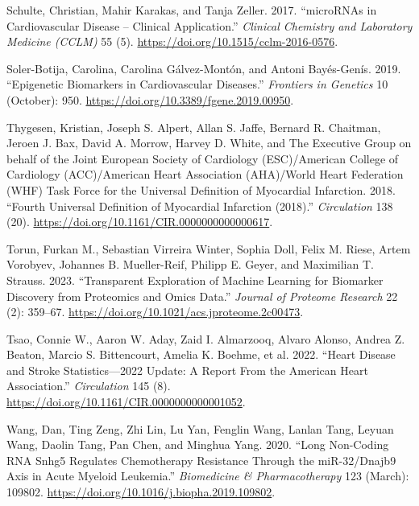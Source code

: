 \documentclass[smallextended]{svjour3}       %
\newlength{\cslhangindent}
\newlength{\cslentryspacingunit} %
\newenvironment{CSLReferences}[2] %
 {%
  \setlength{\parindent}{0pt}
  \ifodd #1
  \let\oldpar\par
  \def\par{\hangindent=\cslhangindent\oldpar}
  \fi
  \setlength{\parskip}{#2\cslentryspacingunit}
 }%
 {}
\begin{document}
\begin{CSLReferences}{1}{0}
\leavevmode{}%
Schulte, Christian, Mahir Karakas, and Tanja Zeller. 2017.
{``{microRNAs} in Cardiovascular Disease -- Clinical Application.''}
\emph{Clinical Chemistry and Laboratory Medicine (CCLM)} 55 (5).
\url{https://doi.org/10.1515/cclm-2016-0576}.

\leavevmode{}%
Soler-Botija, Carolina, Carolina Gálvez-Montón, and Antoni Bayés-Genís.
2019. {``Epigenetic {Biomarkers} in {Cardiovascular} {Diseases}.''}
\emph{Frontiers in Genetics} 10 (October): 950.
\url{https://doi.org/10.3389/fgene.2019.00950}.

\leavevmode{}%
Thygesen, Kristian, Joseph S. Alpert, Allan S. Jaffe, Bernard R.
Chaitman, Jeroen J. Bax, David A. Morrow, Harvey D. White, and The
Executive Group on behalf of the Joint European Society of Cardiology
(ESC)/American College of Cardiology (ACC)/American Heart Association
(AHA)/World Heart Federation (WHF) Task Force for the Universal
Definition of Myocardial Infarction. 2018. {``Fourth {Universal}
{Definition} of {Myocardial} {Infarction} (2018).''} \emph{Circulation}
138 (20). \url{https://doi.org/10.1161/CIR.0000000000000617}.

\leavevmode{}%
Torun, Furkan M., Sebastian Virreira Winter, Sophia Doll, Felix M.
Riese, Artem Vorobyev, Johannes B. Mueller-Reif, Philipp E. Geyer, and
Maximilian T. Strauss. 2023. {``Transparent {Exploration} of {Machine}
{Learning} for {Biomarker} {Discovery} from {Proteomics} and {Omics}
{Data}.''} \emph{Journal of Proteome Research} 22 (2): 359--67.
\url{https://doi.org/10.1021/acs.jproteome.2c00473}.

\leavevmode{}%
Tsao, Connie W., Aaron W. Aday, Zaid I. Almarzooq, Alvaro Alonso, Andrea
Z. Beaton, Marcio S. Bittencourt, Amelia K. Boehme, et al. 2022.
{``Heart {Disease} and {Stroke} {Statistics}---2022 {Update}: {A}
{Report} {From} the {American} {Heart} {Association}.''}
\emph{Circulation} 145 (8).
\url{https://doi.org/10.1161/CIR.0000000000001052}.

\leavevmode{}%
Wang, Dan, Ting Zeng, Zhi Lin, Lu Yan, Fenglin Wang, Lanlan Tang, Leyuan
Wang, Daolin Tang, Pan Chen, and Minghua Yang. 2020. {``Long Non-Coding
{RNA} {Snhg5} Regulates Chemotherapy Resistance Through the
{miR}-32/{Dnajb9} Axis in Acute Myeloid Leukemia.''} \emph{Biomedicine
\& Pharmacotherapy} 123 (March): 109802.
\url{https://doi.org/10.1016/j.biopha.2019.109802}.


\end{CSLReferences}
\end{document}
